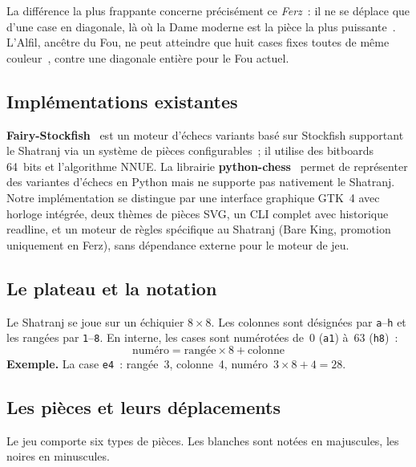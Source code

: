 \documentclass[a4paper,11pt]{article}
\begin{document}
La différence la plus frappante concerne précisément ce \emph{Ferz}~: il ne
se déplace que d'une case en diagonale, là où la Dame moderne est la pièce la
plus puissante~\cite{Davidson1949}. L'Alfil, ancêtre du Fou, ne peut atteindre
que huit cases fixes toutes de même couleur~\cite{Browne2012}, contre une
diagonale entière pour le Fou actuel.

\subsection{Implémentations existantes}

\textbf{Fairy-Stockfish}~\cite{FairyStockfish} est un moteur d'échecs variants
basé sur Stockfish supportant le Shatranj via un système de pièces
configurables~; il utilise des bitboards 64~bits et l'algorithme NNUE.
La librairie \textbf{python-chess}~\cite{Pythonchess} permet de représenter
des variantes d'échecs en Python mais ne supporte pas nativement le Shatranj.
Notre implémentation se distingue par une interface graphique GTK~4 avec
horloge intégrée, deux thèmes de pièces SVG, un CLI complet avec historique
readline, et un moteur de règles spécifique au Shatranj (Bare King, promotion
uniquement en Ferz), sans dépendance externe pour le moteur de jeu.

\subsection{Le plateau et la notation}

Le Shatranj se joue sur un échiquier $8 \times 8$. Les colonnes sont désignées
par \texttt{a}--\texttt{h} et les rangées par \texttt{1}--\texttt{8}. En
interne, les cases sont numérotées de~0 (\texttt{a1}) à~63 (\texttt{h8})~:
\[
  \text{numéro} = \text{rangée} \times 8 + \text{colonne}
\]
\noindent\textbf{Exemple.} La case \texttt{e4}~: rangée~3, colonne~4,
numéro~$3 \times 8 + 4 = 28$.

\subsection{Les pièces et leurs déplacements}
Le jeu comporte six types de pièces. Les blanches sont notées en majuscules,
les noires en minuscules.
\end{document}
